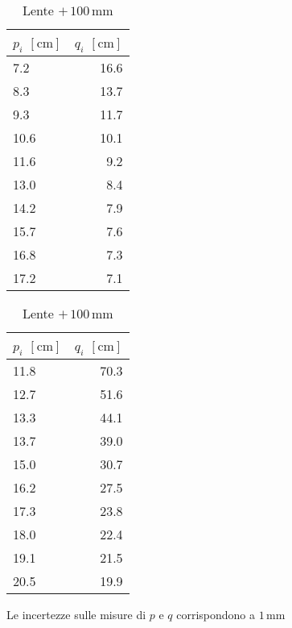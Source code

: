 \documentclass{article}[a4paper,11pt]
\begin{document}
\begin{table}[!htb]
 \begin{minipage}{.5\linewidth}
  \centering
	\begin{tabular}{lr}
	\toprule
	$p_i$ $[\si{\cm}]$ & $q_i$ $[\si{\cm}]$ \\
	\midrule
	\midrule
	7.2 & 16.6 \\
	8.3 & 13.7 \\
	9.3 & 11.7 \\	
	10.6 & 10.1 \\
	11.6 &	9.2 \\
	13.0 &	8.4 \\
	14.2 &	7.9 \\
	15.7 &	7.6 \\
	16.8 &	7.3 \\
	17.2 &	7.1 \\
	\bottomrule
	\end{tabular}
  \caption{Lente $ +\, 50  \, \si{\mm}$ \label{tab:conv5}}
\end{minipage}%
\begin{minipage}{.5\linewidth}
 \centering
	\begin{tabular}{lr}
	\toprule
	$p_i$ $[\si{\cm}]$ & $q_i$ $[\si{\cm}]$ \\
	\midrule
	\midrule
	11.8 &	70.3 \\
	12.7 &	51.6 \\
	13.3 &	44.1 \\	
	13.7 &	39.0 \\
	15.0 &	30.7 \\
	16.2 &	27.5 \\
	17.3 &	23.8 \\
	18.0 &	22.4 \\
	19.1 &	21.5 \\
	20.5 &	19.9 \\
	\bottomrule
	\end{tabular}
  \caption{Lente $ +\, 100 \, \si{\mm}$ \label{tab:conv10}}
\end{minipage}
\begin{center}
Le incertezze sulle misure di $p$ e $q$ corrispondono a $1 \, \si{\mm}$
\end{center}
\end{table}
\end{document}
